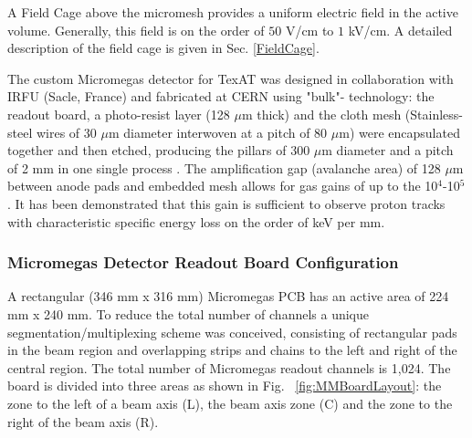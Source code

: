 \documentclass[final,number,sort&compress,5p,times,twocolumn]{elsarticle}
\begin{document}
A Field Cage above the micromesh provides a uniform electric field in the active volume. Generally, this field is on the order of $50$ V/cm to $1$ kV/cm. A detailed description of the field cage is given in Sec. \ref{FieldCage}.

The custom  Micromegas detector for TexAT was designed in collaboration with IRFU (Sacle, France) and fabricated at CERN using "bulk"- technology: the readout board, a photo-resist layer (128 $\mu$m thick) and the cloth mesh  (Stainless- steel wires of 30 $\mu$m diameter interwoven at a pitch of 80 $\mu$m)  were encapsulated together and then etched, producing the pillars of 300 $\mu$m diameter and a pitch of 2 mm in one single process \cite{GIOMATARIS2006}. The amplification gap (avalanche area) of 128 $\mu$m between anode pads and embedded mesh allows for gas gains of up to the 10$^{4}$-10$^{5}$. It has been demonstrated that this gain is sufficient to observe proton tracks with characteristic specific energy loss on the order of keV per mm.

\subsubsection{Micromegas Detector Readout Board Configuration}
	
A rectangular (346 mm  x 316 mm) Micromegas PCB has an active area of 224 mm x 240 mm. To reduce the total number of channels  a unique segmentation/multiplexing scheme was conceived, consisting of rectangular pads in the beam region and overlapping strips and chains to the left and right of the central region. The total number of Micromegas readout channels is 1,024. The board  is divided into three areas as shown in Fig. ~\ref{fig:MMBoardLayout}: the zone to the left of a beam axis (L), the beam axis zone (C) and the zone to the right of the beam axis (R).
\end{document}
